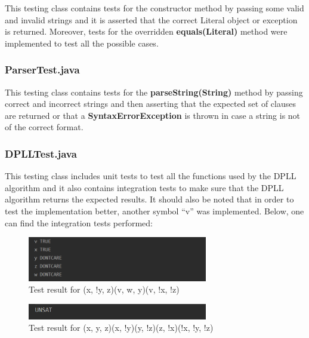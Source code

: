 \documentclass{article}
\newcommand{\quotes}[1]{``#1''}
\begin{document}
	This testing class contains tests for the constructor method by passing some valid and invalid strings and it is asserted that the correct Literal object or exception is returned. Moreover, tests for the overridden \textbf{equals(Literal)} method were implemented to test all the possible cases.
	
	\subsubsection{ParserTest.java}
	
	This testing class contains tests for the \textbf{parseString(String)} method by passing correct and incorrect strings and then asserting that the expected set of clauses are returned or that a \textbf{SyntaxErrorException} is thrown in case a string is not of the correct format.
	
	\subsubsection{DPLLTest.java}
	
	This testing class includes unit tests to test all the functions used by the DPLL algorithm and it also contains integration tests to make sure that the DPLL algorithm returns the expected results. It should also be noted that in order to test the implementation better, another symbol \quotes{v} was implemented.
	Below, one can find the integration tests performed:
	
	
	\begin{figure}[H]
					\centering
			 			\includegraphics[width=0.7\textwidth]{dplltest1.png}
			 			\centering
			  			\caption{Test result for (x, !y, z)(v, w, y)(v, !x, !z)}
			  			\label{fig:dplltest1}
					\end{figure}
					
	
	\begin{figure}[H]
					\centering
			 			\includegraphics[width=0.7\textwidth]{dplltest2.png}
			 			\centering
			  			\caption{Test result for (x, y, z)(x, !y)(y, !z)(z, !x)(!x, !y, !z)}
			  			\label{fig:dplltest2}
					\end{figure}
		
\end{document}
